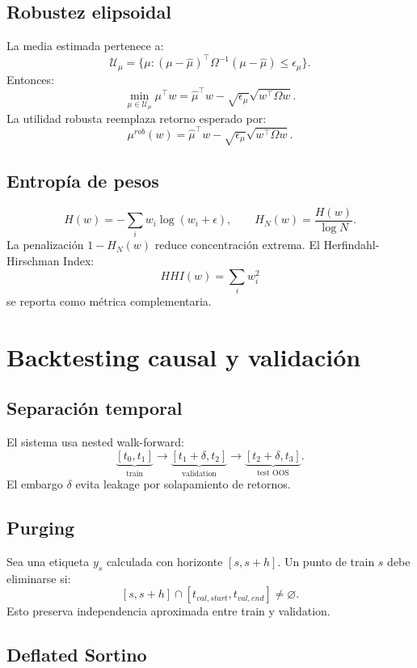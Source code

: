 \documentclass[11pt,letterpaper]{article}
\newcommand{\1}{\mathbf{1}}
\begin{document}
\subsection{Robustez elipsoidal}

La media estimada pertenece a:
\[
    \mathcal{U}_\mu
    =
    \{\mu:(\mu-\hat\mu)^\top\Omega^{-1}(\mu-\hat\mu)\le \epsilon_\mu\}.
\]
Entonces:
\[
    \min_{\mu\in\mathcal{U}_\mu}\mu^\top w
    =
    \hat\mu^\top w
    -
    \sqrt{\epsilon_\mu}\sqrt{w^\top\Omega w}.
\]
La utilidad robusta reemplaza retorno esperado por:
\[
    \mu^{rob}(w)
    =
    \hat\mu^\top w
    -
    \sqrt{\epsilon_\mu}\sqrt{w^\top\Omega w}.
\]

\subsection{Entropía de pesos}

\[
    H(w)
    =
    -\sum_i w_i\log(w_i+\epsilon),
    \qquad
    H_N(w)=\frac{H(w)}{\log N}.
\]
La penalización \(1-H_N(w)\) reduce concentración extrema. El Herfindahl-Hirschman Index:
\[
    HHI(w)=\sum_i w_i^2
\]
se reporta como métrica complementaria.

\newpage
\section{Backtesting causal y validación}

\subsection{Separación temporal}

El sistema usa nested walk-forward:
\[
    \underbrace{[t_0,t_1]}_{\text{train}}
    \rightarrow
    \underbrace{[t_1+\delta,t_2]}_{\text{validation}}
    \rightarrow
    \underbrace{[t_2+\delta,t_3]}_{\text{test OOS}}.
\]
El embargo \(\delta\) evita leakage por solapamiento de retornos.

\subsection{Purging}

Sea una etiqueta \(y_s\) calculada con horizonte \([s,s+h]\). Un punto de train \(s\) debe eliminarse si:
\[
    [s,s+h]\cap[t_{val,start},t_{val,end}]\ne\varnothing.
\]
Esto preserva independencia aproximada entre train y validation.

\subsection{Deflated Sortino}
\end{document}

